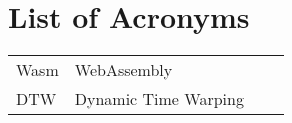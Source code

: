 \chapter{List of Acronyms}

\begin{table}[h]
\begin{tabular}{p{2.7cm}lp{8cm}l}

Wasm               & WebAssembly \\
DTW               & Dynamic Time Warping \\ 	

\end{tabular}
\end{table}